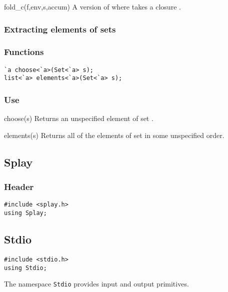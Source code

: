 \begin{defun}{fold_c}{(f,env,s,accum)}
A version of  where  takes a closure .
\end{defun}

\subsubsection*{Extracting elements of sets}
\subsubsection*{Functions}
\begin{verbatim}
`a choose<`a>(Set<`a> s);
list<`a> elements<`a>(Set<`a> s);
\end{verbatim}

\subsubsection*{Use}

\begin{defun}{choose}{(s)}
Returns an unspecified element of set .
\end{defun}

\begin{defun}{elements}{(s)}
Returns all of the elements of set  in some unspecified order.
\end{defun}

\subsection{Splay}

\subsubsection*{Header}
\begin{verbatim}
#include <splay.h>
using Splay;
\end{verbatim}

\subsection{Stdio}

\begin{verbatim}
#include <stdio.h>
using Stdio;
\end{verbatim}

The namespace \texttt{Stdio} provides input and output primitives.


